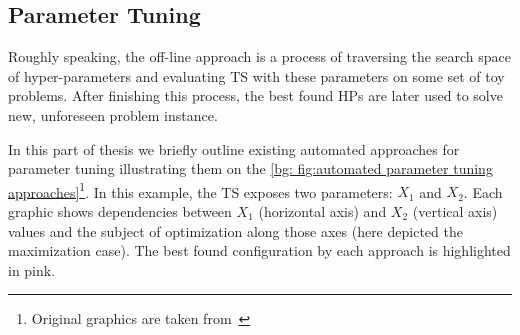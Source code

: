 
\subsection{Parameter Tuning}\label{bg: parameter tuning}
Roughly speaking, the off-line approach is a process of traversing the search space of hyper-parameters and evaluating TS with these parameters on some set of toy problems. After finishing this process, the best found HPs are later used to solve new, unforeseen problem instance.

In this part of thesis we briefly outline existing automated approaches for parameter tuning illustrating them on the \cref{bg: fig:automated parameter tuning approaches}\footnote{Original graphics are taken from~\cite{koch2017automated}}. In this example, the TS exposes two parameters: $X_1$ and $X_2$. Each graphic shows dependencies between $X_1$ (horizontal axis) and $X_2$ (vertical axis) values and the subject of optimization along those axes (here depicted the maximization case). The best found configuration by each approach is highlighted in pink.

